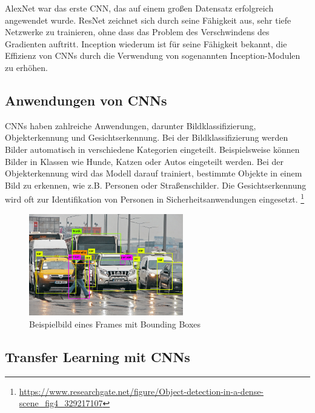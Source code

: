         AlexNet war das erste CNN, das auf einem großen Datensatz erfolgreich angewendet wurde.
        ResNet zeichnet sich durch seine Fähigkeit aus, sehr tiefe Netzwerke zu trainieren, ohne dass das Problem des Verschwindens des Gradienten auftritt.  
        Inception wiederum ist für seine Fähigkeit bekannt, die Effizienz von CNNs durch die Verwendung von sogenannten Inception-Modulen zu erhöhen.
    
    \subsection{Anwendungen von CNNs}
    
        CNNs haben zahlreiche Anwendungen, darunter Bildklassifizierung, Objekterkennung und Gesichtserkennung.      
        Bei der Bildklassifizierung werden Bilder automatisch in verschiedene Kategorien eingeteilt.      
        Beispielsweise können Bilder in Klassen wie Hunde, Katzen oder Autos eingeteilt werden.  
        Bei der Objekterkennung wird das Modell darauf trainiert, bestimmte Objekte in einem Bild zu erkennen, wie z.B.      Personen oder Straßenschilder.      
        Die Gesichtserkennung wird oft zur Identifikation von Personen in Sicherheitsanwendungen eingesetzt.
        \footnote{\url{https://www.researchgate.net/figure/Object-detection-in-a-dense-scene_fig4_329217107}}

        \begin{figure}[h]
            \centering
            \includegraphics[width=0.6\textwidth]{img/Object-detection-in-a-dense-scene.ppm.png}
            \caption{Beispielbild eines Frames mit Bounding Boxes}
            \label{fig:Beispielbild_eines_Frames_mit_Bounding_Boxes}
        \end{figure}


    \subsection{Transfer Learning mit CNNs}
    
